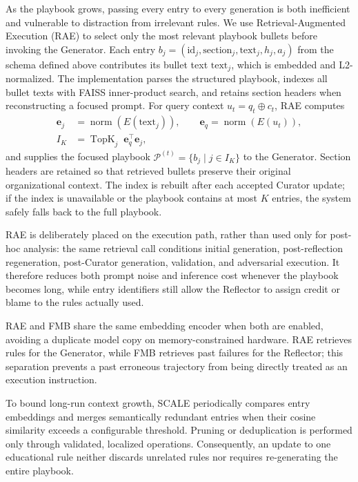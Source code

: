 \documentclass[10pt,conference]{IEEEtran}
\begin{document}
As the playbook grows, passing every entry to every generation is both 
inefficient and vulnerable to distraction from irrelevant rules. We use 
Retrieval-Augmented Execution (RAE) to select only the most relevant 
playbook bullets before invoking the Generator. Each entry
$b_j=(\mathrm{id}_j,\mathrm{section}_j,\mathrm{text}_j,h_j,a_j)$ from the
schema defined above contributes its bullet text $\mathrm{text}_j$,
which is embedded and L2-normalized.
The implementation parses the structured playbook, indexes all bullet
texts with FAISS inner-product search, and retains section headers when
reconstructing a focused prompt. For query context $u_t=q_t\oplus c_t$,
RAE computes
\begin{align}
    \mathbf{e}_j &= \operatorname{norm}(E(\mathrm{text}_j)),\qquad
    \mathbf{e}_q=\operatorname{norm}(E(u_t)),\\
    I_K &= \operatorname{TopK}_j\; \mathbf{e}_q^\top\mathbf{e}_j,
    \label{eq:ace-rae}
\end{align}
and supplies the focused playbook
$\mathcal{P}^{(t)}=\{b_j\mid j\in I_K\}$ to the Generator. Section 
headers are retained so that retrieved bullets preserve their original 
organizational context. The index is rebuilt after each accepted Curator 
update; if the index is unavailable or the playbook contains at most $K$ 
entries, the system safely falls back to the full playbook.

RAE is deliberately placed on the execution path, rather than used only 
for post-hoc analysis: the same retrieval call conditions initial 
generation, post-reflection regeneration, post-Curator generation, 
validation, and adversarial execution. It therefore reduces both prompt 
noise and inference cost whenever the playbook becomes long, while entry 
identifiers still allow the Reflector to assign credit or blame to the 
rules actually used.

RAE and FMB share the same embedding encoder when both are enabled, 
avoiding a duplicate model copy on memory-constrained hardware. RAE 
retrieves rules for the Generator, while FMB retrieves past failures for 
the Reflector; this separation prevents a past erroneous trajectory from 
being directly treated as an execution instruction.

To bound long-run context growth, SCALE periodically compares entry 
embeddings and merges semantically redundant entries when their cosine 
similarity exceeds a configurable threshold. Pruning or deduplication is 
performed only through validated, localized operations. Consequently, an 
update to one educational rule neither discards unrelated rules nor 
requires re-generating the entire playbook.
\end{document}
